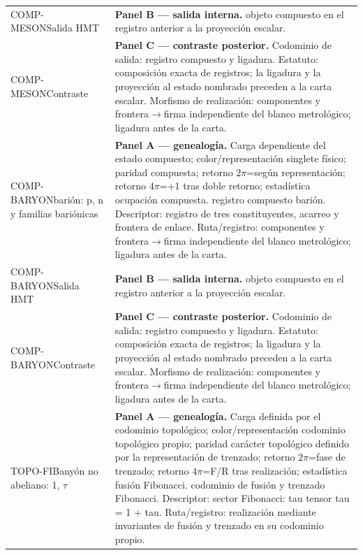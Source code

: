 \begin{longtable}{@{}>{\raggedright\arraybackslash}p{2.55cm}>{\raggedright\arraybackslash}p{11.75cm}@{}}
COMP-MESON\newline Salida HMT & \textbf{Panel B --- salida interna. }objeto compuesto en el registro anterior a la proyección escalar. \\
COMP-MESON\newline Contraste & \textbf{Panel C --- contraste posterior. }Codominio de salida: registro compuesto y ligadura. Estatuto: composición exacta de registros; la ligadura y la proyección al estado nombrado preceden a la carta escalar. Morfismo de realización: componentes y frontera\(\to\)\allowbreak{}firma independiente del blanco metrológico; ligadura antes de la carta. \\\addlinespace[2pt]
COMP-BARYON\newline barión: p, n y familias bariónicas & \textbf{Panel A --- genealogía. }Carga dependiente del estado compuesto; color/representación singlete físico; paridad compuesta; retorno \(2\pi\)=según representación; retorno \(4\pi\)=+1 tras doble retorno; estadística ocupación compuesta. registro compuesto barión. Descriptor: registro de tres constituyentes, acarreo y frontera de enlace. Ruta/registro: componentes y frontera\(\to\)\allowbreak{}firma independiente del blanco metrológico; ligadura antes de la carta. \\
COMP-BARYON\newline Salida HMT & \textbf{Panel B --- salida interna. }objeto compuesto en el registro anterior a la proyección escalar. \\
COMP-BARYON\newline Contraste & \textbf{Panel C --- contraste posterior. }Codominio de salida: registro compuesto y ligadura. Estatuto: composición exacta de registros; la ligadura y la proyección al estado nombrado preceden a la carta escalar. Morfismo de realización: componentes y frontera\(\to\)\allowbreak{}firma independiente del blanco metrológico; ligadura antes de la carta. \\\addlinespace[2pt]
TOPO-FIB\newline anyón no abeliano: 1, \(\tau\) & \textbf{Panel A --- genealogía. }Carga definida por el codominio topológico; color/representación codominio topológico propio; paridad carácter topológico definido por la representación de trenzado; retorno \(2\pi\)=fase de trenzado; retorno \(4\pi\)=F/R tras realización; estadística fusión Fibonacci. codominio de fusión y trenzado Fibonacci. Descriptor: sector Fibonacci: tau tensor tau = 1 + tau. Ruta/registro: realización mediante invariantes de fusión y trenzado en su codominio propio. \\

\end{longtable}
